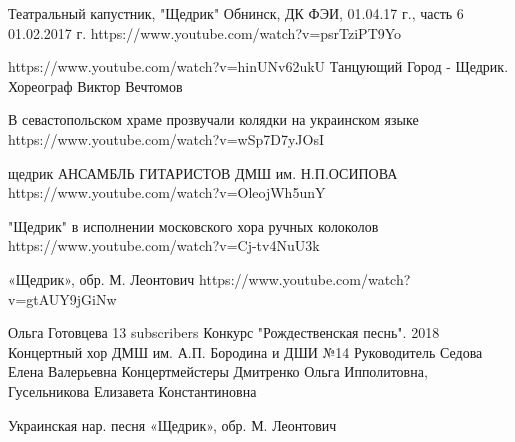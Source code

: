 Театральный капустник, "Щедрик" Обнинск, ДК ФЭИ, 01.04.17 г., часть 6 01.02.2017 г.
https://www.youtube.com/watch?v=psrTziPT9Yo

https://www.youtube.com/watch?v=hinUNv62ukU
Танцующий Город - Щедрик. Хореограф Виктор Вечтомов

В севастопольском храме прозвучали колядки на украинском языке
https://www.youtube.com/watch?v=wSp7D7yJOsI

щедрик
АНСАМБЛЬ ГИТАРИСТОВ ДМШ им. Н.П.ОСИПОВА
https://www.youtube.com/watch?v=OleojWh5unY

"Щедрик" в исполнении московского хора ручных колоколов
https://www.youtube.com/watch?v=Cj-tv4NuU3k

«Щедрик», обр. М. Леонтович
https://www.youtube.com/watch?v=gtAUY9jGiNw

Ольга Готовцева
13 subscribers
Конкурс "Рождественская песнь". 2018
Концертный хор ДМШ им. А.П. Бородина и ДШИ №14
Руководитель Седова Елена Валерьевна
Концертмейстеры Дмитренко Ольга Ипполитовна,
Гусельникова Елизавета Константиновна

Украинская нар. песня
«Щедрик», обр. М. Леонтович

